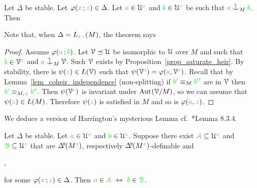 \begin{theorem}[ (Symmetry)]\label{thm_symmetry}
  Let $\Delta$ be stable. 
  Let $\varphi({\color{brown} x}\,;{\color{green} z})\in\Delta$.
  Let ${\color{brown} a}\in\EuScript U^{\color{brown} x}$ and ${\color{green} b}\in\EuScript U^{\color{green} z}$ be such that ${\mr a}\cnonfork_M{\gr b}$.
  Then\smallskip

\end{theorem}

Note that, when $\Delta= L_{{\color{brown} x}\,{\color{green} z}}(M)$, the theorem says


\vspace*{-\parskip}
\begin{proof}
  Assume $\varphi({\color{brown} a}\,;{\color{green} b})$.
  Let $\EuScript V\preceq\EuScript U$ be isomorphic to $\EuScript U$ over $M$ and such that ${\color{green} b}\in\EuScript V^{\color{green} z}$ and ${\mr a}\cnonfork_M\V$. Such $\EuScript V$ exists by Proposition~\ref{prop_saturate_heir}.
  By stability, there is $\psi({\color{green} z})\in L(\EuScript V)$ such that $\psi(\EuScript V^{\color{green} z})=\varphi({\color{brown} a},\EuScript V^{\color{green} z})$.
  Recall that by Lemma~\ref{lem_coheir_independence} (non-splitting) if ${\color{green} b'}\equiv_M{\color{green} b''}$ are in $\EuScript V$ then ${\color{green} b'}\equiv_{M,\kern.2ex{\color{brown} a}}{\color{green} b''}$.
  Then $\psi(\EuScript V^{\color{green} z})$ is invariant under ${\rm Aut\kern.15ex}(\EuScript V/M)$, so we can assume that $\psi({\color{green} z})\in L(M)$.
  Therefore $\psi({\color{green} z})$ is satisfied in $M$ and so is $\varphi({\color{brown} a},{\color{green} z})$.
\end{proof}

We deduce a version of Harrington's mysterious Lemma cf.~\cite{TZ}*{Lemma 8.3.4}.

\begin{corollary}\label{corol_harrington0}
  Let $\Delta$ be stable.
  Let ${\color{brown} a}\in\EuScript U^{\color{brown} x}$ and ${\color{green} b}\in\EuScript U^{\color{green} z}$. 
  Suppose there exist ${\color{brown}\EuScript A}\subseteq\EuScript U^{\color{brown} x}$ and ${\color{green}\EuScript B}\subseteq\EuScript U^{\color{green} z}$ that are $\BDelta(M^{\gr z})$, respectively $\BDelta(M^{\mr x})$-definable and \smallskip

  \smallskip

  ,\smallskip

  for some $\varphi({\color{brown} x}\,;{\color{green} z})\in\Delta$.
  Then ${\mr a}\in\mrA\ \iff\ {\gr b}\in\grB$.
\end{corollary}

